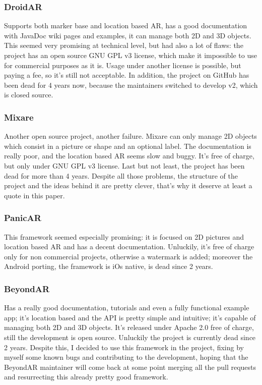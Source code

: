 			\subsubsection{DroidAR}
				
				Supports both marker base and location based AR, has a good documentation with JavaDoc wiki pages and examples, it can manage both 2D and 3D objects.
				This seemed very promising at technical level, but had also a lot of flaws: the project has an open source GNU GPL v3 license, which make it impossible to use for commercial purposes as it is. Usage under another license is possible, but paying a fee, so it's still not acceptable.
				In addition, the project on GitHub has been dead for 4 years now, because the maintainers switched to develop v2, which is closed source.
			
			\subsubsection{Mixare}
			
				Another open source project, another failure. Mixare can only manage 2D objects which consist in a picture or shape and an optional label. The documentation is really poor, and the location based AR seems slow and buggy. It's free of charge, but only under GNU GPL v3 license. Last but not least, the project has been dead for more than 4 years.
				Despite all those problems, the structure of the project and the ideas behind it are pretty clever, that's why it deserve at least a quote in this paper.
			
			\subsubsection{PanicAR}
			
				This framework seemed especially promising: it is focused on 2D pictures and location based AR and has a decent documentation.
				Unluckily, it's free of charge only for non commercial projects, otherwise a watermark is added; moreover the Android porting, the framework is iOs native, is dead since 2 years.
			
			\subsubsection{BeyondAR}
			
				Has a really good documentation, tutorials and even a fully functional example app; it's location based and the API is pretty simple and intuitive; it's capable of managing both 2D and 3D objects. It's released under Apache 2.0 free of charge, still the development is open source.
				Unluckily the project is currently dead since 2 years. Despite this, I decided to use this framework in the project, fixing by myself some known bugs and contributing to the development, hoping that the BeyondAR maintainer will come back at some point merging all the pull requests and resurrecting this already pretty good framework.
		
